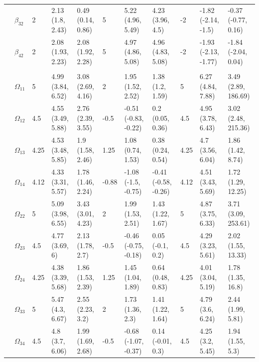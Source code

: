 \documentclass{article}
\begin{document}
\begin{landscape}
\begin{table}[t]
\begin{tabular}{lllllllllll}
\hspace{1em} & $\beta_{32}$ & 2 & 2.13 (1.8, 2.43) & 0.49 (0.14, 0.86) & 5 & 5.22 (4.96, 5.49) & 4.23 (3.96, 4.5) & -2 & -1.82 (-2.14, -1.5) & -0.37 (-0.77, 0.16)\\
\hspace{1em} & $\beta_{42}$ & 2 & 2.08 (1.93, 2.23) & 2.08 (1.92, 2.28) & 5 & 4.97 (4.86, 5.08) & 4.96 (4.83, 5.08) & -2 & -1.93 (-2.13, -1.77) & -1.84 (-2.04, 0.04)\\
\addlinespace[0.3em]
\multicolumn{11}{l}{\textbf{ }}\\
\hspace{1em} & $\Omega_{11}$ & 5 & 4.99 (3.84, 6.52) & 3.08 (2.69, 4.16) & 2 & 1.95 (1.52, 2.52) & 1.38 (1.2, 1.59) & 5 & 6.27 (4.84, 7.88) & 3.49 (2.89, 186.69)\\
\hspace{1em} & $\Omega_{12}$ & 4.5 & 4.55 (3.49, 5.88) & 2.76 (2.39, 3.55) & -0.5 & -0.51 (-0.83, -0.22) & 0.2 (0.05, 0.36) & 4.5 & 4.95 (3.78, 6.43) & 3.02 (2.48, 215.36)\\
\hspace{1em} & $\Omega_{13}$ & 4.25 & 4.53 (3.48, 5.85) & 1.9 (1.58, 2.46) & 1.25 & 1.08 (0.74, 1.53) & 0.38 (0.24, 0.54) & 4.25 & 4.7 (3.56, 6.04) & 1.86 (1.42, 8.74)\\
\hspace{1em} & $\Omega_{14}$ & 4.12 & 4.33 (3.31, 5.57) & 1.78 (1.46, 2.24) & -0.88 & -1.08 (-1.5, -0.75) & -0.41 (-0.58, -0.26) & 4.12 & 4.51 (3.43, 5.69) & 1.72 (1.29, 12.25)\\
\hspace{1em} & $\Omega_{22}$ & 5 & 5.09 (3.98, 6.55) & 3.43 (3.01, 4.23) & 2 & 1.99 (1.53, 2.51) & 1.43 (1.22, 1.67) & 5 & 4.87 (3.75, 6.33) & 3.71 (3.09, 253.61)\\
\hspace{1em} & $\Omega_{23}$ & 4.5 & 4.77 (3.69, 6) & 2.13 (1.78, 2.7) & -0.5 & -0.46 (-0.75, -0.18) & 0.05 (-0.1, 0.2) & 4.5 & 4.29 (3.23, 5.61) & 2.02 (1.55, 13.33)\\
\hspace{1em} & $\Omega_{24}$ & 4.25 & 4.38 (3.39, 5.68) & 1.86 (1.53, 2.39) & 1.25 & 1.45 (1.04, 1.89) & 0.64 (0.48, 0.83) & 4.25 & 4.01 (3.04, 5.19) & 1.78 (1.35, 16.8)\\
\hspace{1em} & $\Omega_{33}$ & 5 & 5.47 (4.3, 6.67) & 2.55 (2.23, 3.2) & 2 & 1.73 (1.36, 2.3) & 1.41 (1.22, 1.64) & 5 & 4.79 (3.6, 6.24) & 2.44 (1.99, 5.81)\\
\hspace{1em} & $\Omega_{34}$ & 4.5 & 4.8 (3.7, 6.06) & 1.99 (1.69, 2.68) & -0.5 & -0.68 (-1.07, -0.37) & 0.14 (-0.01, 0.3) & 4.5 & 4.25 (3.2, 5.45) & 1.94 (1.55, 5.3)\\

\end{tabular}
\end{table}
\end{landscape}
\end{document}
